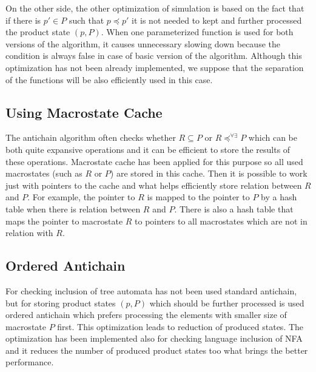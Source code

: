 On the other side, the other optimization of simulation is based on the fact that if there is $p' \in P$ such that $p \preceq p'$ 
it is not needed to kept and further processed the product state $(p,P)$. When one parameterized function is used for both versions of the algorithm, it 
causes unnecessary slowing down because the condition is always false in case of basic version of the algorithm. 
Although this optimization has not been already implemented, we suppose that the separation of the functions will be also 
efficiently used in this case.

\subsection{Using Macrostate Cache}
The antichain algorithm often checks whether $R \subseteq P$ or $R\preceq^{\forall\exists}P$ which can be both quite expansive operations and it can be
efficient to store the results of these operations. Macrostate cache has been applied for this purpose so all used macrostates (such as $R$ or $P$) 
are stored in this cache. Then it is possible to work just with pointers to the cache and what helps efficiently store relation between $R$ and $P$. For example, 
the pointer to $R$ is mapped to the pointer to $P$ by a hash table when there is relation between $R$ and $P$. There is also a hash table that maps
the pointer to macrostate $R$ to pointers to all macrostates which are not in relation with $R$.

\subsection{Ordered Antichain}
For checking inclusion of tree automata has not been used standard antichain, but for storing product states $(p,P)$ which should be further processed
is used ordered antichain \cite{libvata} which prefers processing the elements with smaller size of macrostate $P$ first. This optimization leads to reduction
of produced states. The optimization has been implemented 
also for checking language inclusion of NFA and it reduces the number of produced product states too what brings the better performance.


